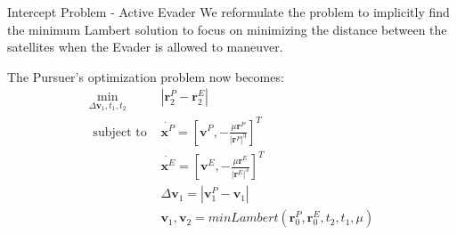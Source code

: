 \begin{frame}{Intercept Problem - Active Evader}
    We reformulate the problem to implicitly find the minimum Lambert solution to focus on minimizing the distance between the satellites when the Evader is allowed to maneuver. 

    The Pursuer's optimization problem now becomes: 
    \begin{align}
        \min_{\Delta \boldsymbol{v}_1, t_1, t_2} \;      & |\boldsymbol{r}^P_2 - \boldsymbol{r}^E_2| \label{eq:min_active_evader_prob} \\ 
        \text{ subject to }             & \dot{\boldsymbol{x}^P} = [\boldsymbol{v}^P, -\frac{\mu \boldsymbol{r}^P}{|\boldsymbol{r}^P|^3}]^T\\
                                        & \dot{\boldsymbol{x}^E} = [\boldsymbol{v}^E, -\frac{\mu \boldsymbol{r}^E}{|\boldsymbol{r}^E|^3}]^T\\
                                        & \Delta \boldsymbol{v}_1 = |\boldsymbol{v}^P_1 - \boldsymbol{v}_1| \\
                                        & \boldsymbol{v}_1, \boldsymbol{v}_2 = minLambert(\boldsymbol{r}^P_0, \boldsymbol{r}^E_0, t_2, t_1, \mu) \label{eq:min_lambert}
    \end{align} 
    

\end{frame}

